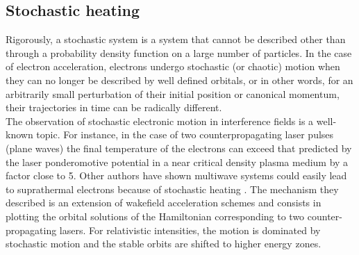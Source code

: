 \subsection{Stochastic heating}

Rigorously, a stochastic system is a system that cannot be described other than through a probability density function on a large number of particles. In the case of electron acceleration, electrons undergo stochastic (or chaotic) motion when they can no longer be described by well defined orbitals, or in other words, for an arbitrarily small perturbation of their initial position or canonical momentum, their trajectories in time can be radically different. \\
\noindent The observation of stochastic electronic motion in interference fields is a well-known topic. For instance, in the case of two counterpropagating laser pulses (plane waves) \cite{sheng2002stochastic} the final temperature of the electrons can exceed that predicted by the laser ponderomotive potential in a near critical density plasma medium by a factor close to 5. Other authors have shown multiwave systems could easily lead to suprathermal electrons because of stochastic heating \cite{mendonca1982stochasticity}.  The mechanism they described is an extension of wakefield acceleration schemes and consists in plotting the orbital solutions of the Hamiltonian corresponding to two counter-propagating lasers. For relativistic intensities, the motion is dominated by stochastic motion and the stable orbits are shifted to higher energy zones.

